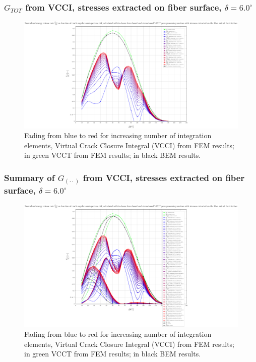 \begin{frame}
\frametitle{\small $G_{TOT}$ from VCCI, stresses extracted on fiber surface, $\delta=6.0^{\circ}$}
\vspace{-0.5cm}
\centering
\captionsetup[figure]{font=scriptsize,labelfont=scriptsize}
\begin{figure}[!h]
\centering
\includegraphics[height=0.7\textheight]{2017-07-25_AbqRunSummary_SmallStrain_D06/pdf/2017-07-25_AbqRunSummary_SmallStrain_D06_F-SoF-VCCT_GTOT.pdf}
  \caption{\scriptsize Fading from blue to red for increasing number of integration elements, Virtual Crack Closure Integral (VCCI) from FEM results; in green VCCT from FEM results; in black BEM results.}
  \label{fig:res1}
\end{figure}
\end{frame}
\begin{frame}
\frametitle{\small Summary of $G_{\left(\cdot\cdot\right)}$ from VCCI, stresses extracted on fiber surface, $\delta=6.0^{\circ}$}
\vspace{-0.5cm}
\centering
\captionsetup[figure]{font=scriptsize,labelfont=scriptsize}
\begin{figure}[!h]
\centering
\includegraphics[height=0.7\textheight]{2017-07-25_AbqRunSummary_SmallStrain_D06/pdf/2017-07-25_AbqRunSummary_SmallStrain_D06_F-SoF-VCCT_Summary.pdf}
  \caption{\scriptsize Fading from blue to red for increasing number of integration elements, Virtual Crack Closure Integral (VCCI) from FEM results; in green VCCT from FEM results; in black BEM results.}
  \label{fig:res1}
\end{figure}
\end{frame}
